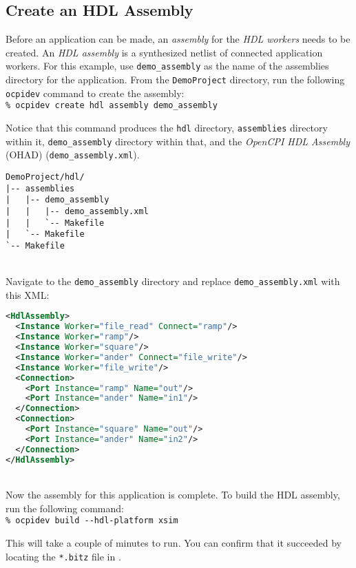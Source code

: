 \subsection{Create an HDL Assembly}
Before an application can be made, an \textit{assembly} for the \textit{HDL workers} needs to be created. An \textit{HDL assembly} is a synthesized netlist of connected application workers. For this example, use \verb+demo_assembly+ as the name of the assemblies directory for the application. From the \verb+DemoProject+ directory, run the following \verb+ocpidev+ command to create the assembly:\\

\forceindent\verb+% ocpidev create hdl assembly demo_assembly+\\
\OcpidevCreate{}

\bstart
Notice that this command produces the \verb+hdl+ directory, \verb+assemblies+ directory within it, \verb+demo_assembly+ directory within that, and the \textit{OpenCPI HDL Assembly} (OHAD) (\verb+demo_assembly.xml+).

\begin{verbatim}
DemoProject/hdl/
|-- assemblies
|   |-- demo_assembly
|   |   |-- demo_assembly.xml
|   |   `-- Makefile
|   `-- Makefile
`-- Makefile
\end{verbatim}
\bend
\pagebreak[1]
~\\
\label{example:assembly}
Navigate to the \verb+demo_assembly+ directory and replace \verb+demo_assembly.xml+ with this XML:
\begin{lstlisting}[language=xml]
<HdlAssembly>
  <Instance Worker="file_read" Connect="ramp"/>
  <Instance Worker="ramp"/>
  <Instance Worker="square"/>
  <Instance Worker="ander" Connect="file_write"/>
  <Instance Worker="file_write"/>
  <Connection>
    <Port Instance="ramp" Name="out"/>
    <Port Instance="ander" Name="in1"/>
  </Connection>
  <Connection>
    <Port Instance="square" Name="out"/>
    <Port Instance="ander" Name="in2"/>
  </Connection>
</HdlAssembly>
\end{lstlisting}
~\\
\label{example:buildasms}
Now the assembly for this application is complete. To build the HDL assembly, run the following command:\\

\forceindent\verb+% ocpidev build --hdl-platform xsim+\\
\OcpidevBuild

This will take a couple of minutes to run. You can confirm that it succeeded by locating the \texttt{*.bitz} file in .\\
